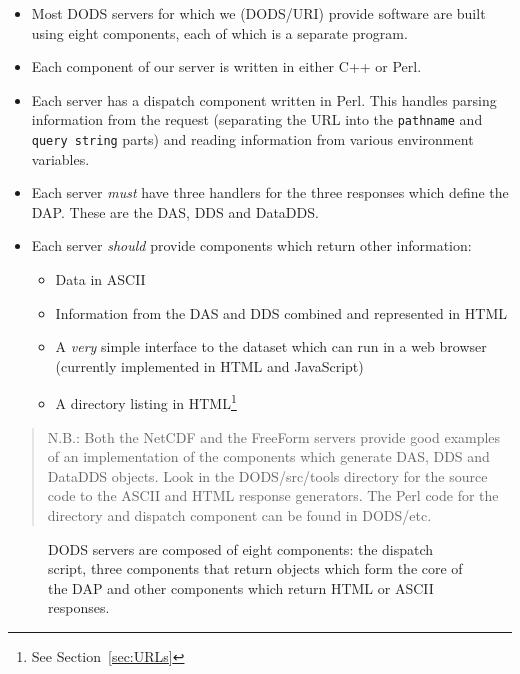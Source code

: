 \documentclass{article}
\begin{document}
\begin{itemize}
\item Most DODS servers for which we (DODS/URI) provide software are built
  using eight components, each of which is a separate program.

\item Each component of our server is written in either C++ or Perl. 
  
\item Each server has a dispatch component written in Perl. This handles
  parsing information from the request (separating the URL into the
  \texttt{pathname} and \texttt{query string} parts) and reading information
  from various environment variables.
  
\item Each server \emph{must} have three handlers for the three responses
  which define the DAP. These are the DAS, DDS and DataDDS.
  
\item Each server \emph{should} provide components which return other
  information:
\begin{itemize}
\item Data in ASCII
\item Information from the DAS and DDS combined and represented in
HTML
\item A \emph{very} simple interface to the dataset which can run in a web
browser (currently implemented in HTML and JavaScript)
\item A directory listing in HTML\footnote{See Section~\ref{sec:URLs}}
\end{itemize}
\end{itemize}

\begin{quote}
N.B.: Both the NetCDF and the FreeForm servers provide good examples of an
implementation of the components which generate DAS, DDS and DataDDS objects.
Look in the DODS/src/tools directory for the source code to the ASCII and
HTML response generators. The Perl code for the directory and dispatch
component can be found in DODS/etc.
\end{quote}

\begin{sidewaysfigure}[h]
\begin{center}
\caption{DODS servers are composed of eight components: the dispatch script,
  three components that return objects which form the core of the DAP and
  other components which return HTML or ASCII responses.}
\label{fig:dods-server-components}
\end{center}
\end{sidewaysfigure}
\end{document}
